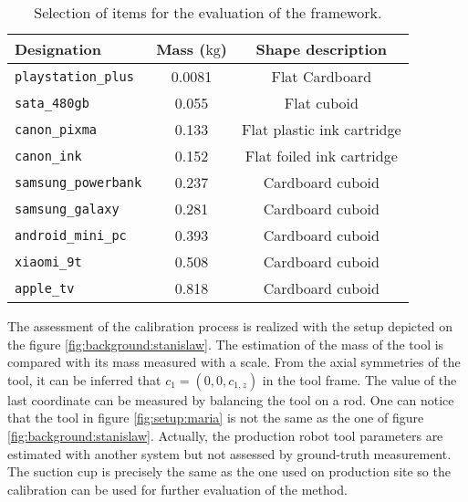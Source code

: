\documentclass[/home/francois/latex/report/main.tex]{subfiles}
\begin{document}
\begin{table}[H]
  \begin{center}
    \renewcommand{\arraystretch}{1.2} %
    \begin{tabular}{l|c|c} %
      \textbf{Designation} & \textbf{Mass ($\si{\kilogram}$)} & \textbf{Shape description}\\
      \hline
      \texttt{playstation\_plus}  & 0.0081 & Flat Cardboard \\
      \hline
      \texttt{sata\_480gb}  & 0.055 & Flat cuboid \\
      \hline
      \texttt{canon\_pixma}  & 0.133 & Flat plastic ink cartridge \\
      \hline
      \texttt{canon\_ink}  & 0.152 & Flat foiled ink cartridge \\
      \hline
      \texttt{samsung\_powerbank}  & 0.237 & Cardboard cuboid \\
      \hline
      \texttt{samsung\_galaxy}  & 0.281 & Cardboard cuboid \\
      \hline
      \texttt{android\_mini\_pc}  & 0.393 & Cardboard cuboid \\
      \hline
      \texttt{xiaomi\_9t}  & 0.508 & Cardboard cuboid \\
      \hline
      \texttt{apple\_tv}  & 0.818 & Cardboard cuboid \\
      \hline
    \end{tabular}
  \end{center}
  \caption{Selection of items for the evaluation of the framework.\label{tab:setup:items}}
\end{table}

The assessment of the calibration process is realized with the setup depicted on the figure \ref{fig:background:stanislaw}. The estimation of the mass of the tool is compared with its mass measured with a scale. From the axial symmetries of the tool, it can be inferred that $c_1 = (0, 0, c_{1,z})$ in the tool frame. The value of the last coordinate can be measured by balancing the tool on a rod. One can notice that the tool in figure \ref{fig:setup:maria} is not the same as the one of figure \ref{fig:background:stanislaw}. Actually, the production robot tool parameters are estimated with another system but not assessed by ground-truth measurement. The suction cup is precisely the same as the one used on production site so the calibration can be used for further evaluation of the method.
\end{document}
